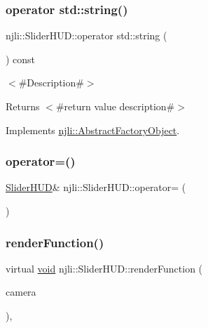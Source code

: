 \subsubsection{\texorpdfstring{operator std\+::string()}{operator std::string()}}
{\footnotesize\ttfamily njli\+::\+Slider\+H\+U\+D\+::operator std\+::string (\begin{DoxyParamCaption}{ }\end{DoxyParamCaption}) const\hspace{0.3cm}{\ttfamily [virtual]}}

$<$\#\+Description\#$>$

\begin{DoxyReturn}{Returns}
$<$\#return value description\#$>$ 
\end{DoxyReturn}


Implements \mbox{\hyperlink{classnjli_1_1_abstract_factory_object_a838f4fa7e65cace6098aab5222892942}{njli\+::\+Abstract\+Factory\+Object}}.

\mbox{\label{classnjli_1_1_slider_h_u_d_a67c6e29fd346f8e303dc477682f0dcf8}} 
\subsubsection{\texorpdfstring{operator=()}{operator=()}}
{\footnotesize\ttfamily \mbox{\hyperlink{classnjli_1_1_slider_h_u_d}{Slider\+H\+UD}}\& njli\+::\+Slider\+H\+U\+D\+::operator= (\begin{DoxyParamCaption}\item[{const \mbox{\hyperlink{classnjli_1_1_slider_h_u_d}{Slider\+H\+UD}} \&}]{ }\end{DoxyParamCaption})\hspace{0.3cm}{\ttfamily [protected]}}

\mbox{\label{classnjli_1_1_slider_h_u_d_abb2dd1860a2ae905408275a8bdad484c}} 
\subsubsection{\texorpdfstring{render\+Function()}{renderFunction()}}
{\footnotesize\ttfamily virtual \mbox{\hyperlink{_thread_8h_af1e856da2e658414cb2456cb6f7ebc66}{void}} njli\+::\+Slider\+H\+U\+D\+::render\+Function (\begin{DoxyParamCaption}\item[{\mbox{\hyperlink{classnjli_1_1_camera}{Camera}} $\ast$}]{camera }\end{DoxyParamCaption})\hspace{0.3cm}{\ttfamily [protected]}, {\ttfamily [virtual]}}



